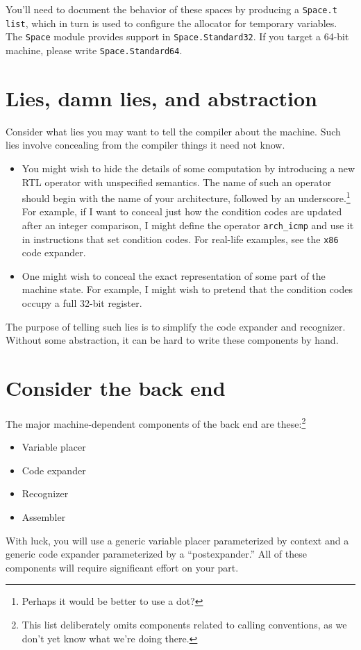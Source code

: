 \documentclass[12pt]{article}
\begin{document}
You'll need to document the behavior of these spaces by producing a
\texttt{Space.t list}, which in turn is used to configure the
allocator for temporary variables.
The \texttt{Space} module provides support in \texttt{Space.Standard32}.
If you target a 64-bit machine, please write \texttt{Space.Standard64}.


\section{Lies, damn lies, and abstraction}

Consider what lies you may want to tell the compiler about the
machine.
Such lies involve concealing from the compiler things it need not
know.
\begin{itemize}
\item
You might wish to hide the details of some computation by introducing
a new RTL operator with unspecified semantics.
The name of such an operator should begin with the name of your
architecture, followed by an underscore.\footnote
{Perhaps it would be better to use a dot?}
For example, if I want to conceal just how the condition codes are
updated after an integer comparison, I might define the operator
\texttt{arch\_icmp} and use it in instructions that set condition codes.
For real-life examples, see the \texttt{x86} code expander.
\item
One might wish to conceal the exact representation of some part of the
machine state.
For example, I might wish to pretend that the condition codes occupy a
full 32-bit register.
\end{itemize}
The purpose of telling such lies is to simplify the code expander and
recognizer.
Without some abstraction, it can be hard to write these components by
hand.

\section{Consider the back end}

The major machine-dependent components of the back end are
these:\footnote
{This list deliberately omits components related to calling
conventions, as we don't yet know what we're doing there.}
\begin{itemize}
\item
Variable placer
\item
Code expander
\item
Recognizer
\item
Assembler
\end{itemize}
With luck, you will use a generic variable placer parameterized by
context and a generic code expander parameterized by a
``postexpander.''
All of these
components will require significant effort on your part.
\end{document}
